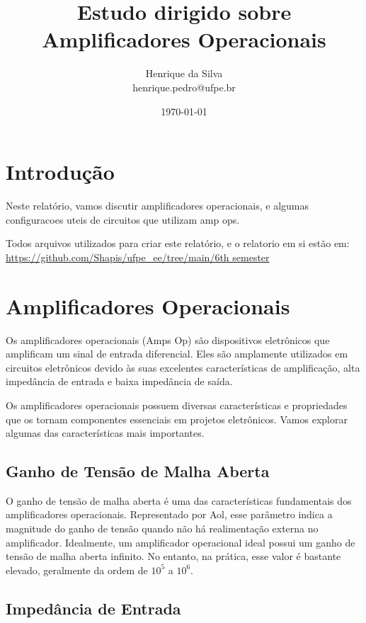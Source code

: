 \documentclass[12pt,twoside, a4paper, twocolumn]{article}
\title{Estudo dirigido sobre Amplificadores Operacionais}
\author{Henrique da Silva \\ henrique.pedro@ufpe.br}
\date{\today}
\begin{document}
\maketitle
{}
\newpage
\tableofcontents
\newpage

\section{Introdução}

Neste relatório, vamos discutir amplificadores operacionais, e algumas configuracoes uteis de circuitos que utilizam amp ops.

Todos arquivos utilizados para criar este relatório, e o relatorio em si estão em:  \url{https://github.com/Shapis/ufpe_ee/tree/main/6th semester}

\section{Amplificadores Operacionais}

Os amplificadores operacionais (Amps Op) são dispositivos eletrônicos que amplificam um sinal de entrada diferencial. Eles são amplamente utilizados em circuitos eletrônicos devido às suas excelentes características de amplificação, alta impedância de entrada e baixa impedância de saída.

Os amplificadores operacionais possuem diversas características e propriedades que os tornam componentes essenciais em projetos eletrônicos. Vamos explorar algumas das características mais importantes.

\subsection{Ganho de Tensão de Malha Aberta}

O ganho de tensão de malha aberta é uma das características fundamentais dos amplificadores operacionais. Representado por Aol, esse parâmetro indica a magnitude do ganho de tensão quando não há realimentação externa no amplificador. Idealmente, um amplificador operacional ideal possui um ganho de tensão de malha aberta infinito. No entanto, na prática, esse valor é bastante elevado, geralmente da ordem de $10^5$ a $10^6$.

\subsection{Impedância de Entrada}
\end{document}
